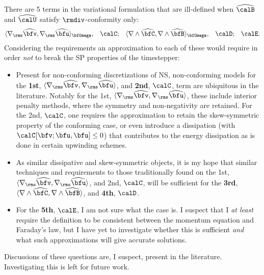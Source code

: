 \begin{remark}
        There are 5 terms in the variational formulation that are ill-defined when $\widehat{\calB}$ and $\widehat{\calU}$ satisfy $\rmdiv$-conformity only:
        \begin{align}
            \langle\nabla_{\rms}\widehat{\bfv}, \nabla_{\rms}\widehat{\bfu}\rangle_{\bfOmega},  &&
            \calC;  &&
            \langle\nabla\wedge\widehat{\bfC}, \nabla\wedge\widehat{\bfB}\rangle_{\bfOmega},  &&
            \calD;  &&
            \calE.
        \end{align}
        Considering the requirements an approximation to each of these would require in order \emph{not} to break the SP properties of the timestepper:
        \begin{itemize}
            \item  Present for non-conforming discretizations of NS, non-conforming models for the {\bf 1st}, $\langle\nabla_{\rms}\widehat{\bfv}, \nabla_{\rms}\widehat{\bfu}\rangle$, and {\bf 2nd}, $\calC$, term are ubiquitous in the literature. Notably for the 1st, $\langle\nabla_{\rms}\widehat{\bfv}, \nabla_{\rms}\widehat{\bfu}\rangle$, these include interior penalty methods, where the symmetry and non-negativity are retained. For the 2nd, $\calC$, one requires the approximation to retain the skew-symmetric property of the conforming case, or even introduce a dissipation (with $\calC[\bfv; \bfu, \bfu] \leq 0$) that contributes to the energy dissipation as is done in certain upwinding schemes.
            \item  As similar dissipative and skew-symmetric objects, it is my hope that similar techniques and requirements to those traditionally found on the 1st, $\langle\nabla_{\rms}\widehat{\bfv}, \nabla_{\rms}\widehat{\bfu}\rangle$, and 2nd, $\calC$, will be sufficient for the {\bf 3rd}, $\langle\nabla\wedge\widehat{\bfC}, \nabla\wedge\widehat{\bfB}\rangle$, and {\bf 4th}, $\calD$.
            \item  For the {\bf 5th}, $\calE$, I am not sure what the case is. I suspect that I \emph{at least} require the definition to be consistent between the momentum equation and Faraday's law, but I have yet to investigate whether this is sufficient \emph{and} what such approximations will give accurate solutions.
        \end{itemize}
        Discussions of these questions are, I suspect, present in the literature. Investigating this is left for future work.
    \end{remark}
    